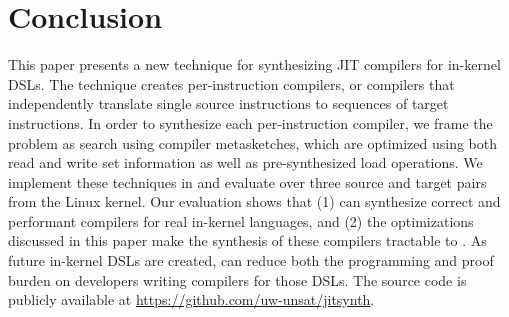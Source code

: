 \section{Conclusion}\label{jitsynth:s:conclusion}
This paper presents a new technique for synthesizing JIT compilers for in-kernel
DSLs. The technique creates per-instruction compilers, or compilers that
independently translate single source instructions to sequences of target
instructions. In order to synthesize each per-instruction compiler, we frame the
problem as search using compiler metasketches, which are optimized using both
read and write set information as well as pre-synthesized load operations. We
implement these techniques in \jitsynth and evaluate \jitsynth over three source
and target pairs from the Linux kernel. Our evaluation shows that (1) \jitsynth
can synthesize correct and performant compilers for real in-kernel languages,
and (2) the optimizations discussed in this paper make the synthesis of these
compilers tractable to \jitsynth. As future in-kernel DSLs are created,
\jitsynth can reduce both the programming and proof burden on developers writing
compilers for those DSLs. The \jitsynth source code is publicly available at
\url{https://github.com/uw-unsat/jitsynth}.
